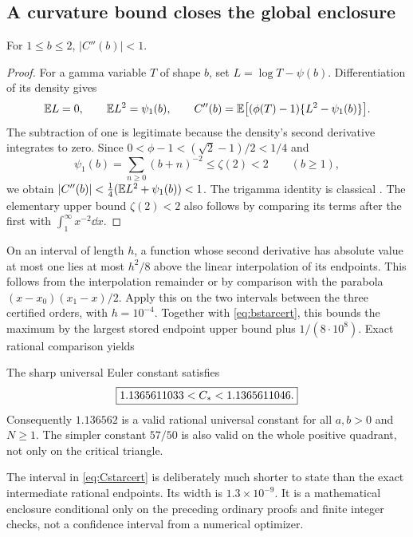 \subsection{A curvature bound closes the global enclosure}
\begin{lemma}\label{lem:curvature}
For $1\le b\le2$, $|C''(b)|<1$.
\end{lemma}
\begin{proof}
For a gamma variable $T$ of shape $b$, set $L=\log T-\psi(b)$. Differentiation of its density gives
\[
 \mathbb E L=0,\qquad \mathbb E L^2=\psi_1(b),\qquad
 C''(b)=\mathbb E\bigl[(\phi(T)-1)\{L^2-\psi_1(b)\}\bigr].
\]
The subtraction of one is legitimate because the density's second derivative integrates to zero. Since $0<\phi-1<(\sqrt2-1)/2<1/4$ and
\[
 \psi_1(b)=\sum_{n\ge0}(b+n)^{-2}\le\zeta(2)<2
 \qquad (b\ge1),
\]
we obtain $|C''(b)|<\tfrac14(\mathbb E L^2+\psi_1(b))<1$. The trigamma identity is classical \cite{DLMFpsi}. The elementary upper bound $\zeta(2)<2$ also follows by comparing its terms after the first with $\int_1^\infty x^{-2}\dd x$.
\end{proof}
On an interval of length $h$, a function whose second derivative has absolute value at most one lies at most $h^2/8$ above the linear interpolation of its endpoints. This follows from the interpolation remainder or by comparison with the parabola $(x-x_0)(x_1-x)/2$.
Apply this on the two intervals between the three certified orders, with $h=10^{-4}$. Together with \eqref{eq:bstarcert}, this bounds the maximum by the largest stored endpoint upper bound plus $1/(8\cdot10^8)$. Exact rational comparison yields
\begin{theorem}\label{thm:certified}
The sharp universal Euler constant satisfies
\begin{equation}\label{eq:Cstarcert}
 \boxed{1.1365611033<C_*<1.1365611046.}
\end{equation}
Consequently $1.136562$ is a valid rational universal constant for all $a,b>0$ and $N\ge1$. The simpler constant $57/50$ is also valid on the whole positive quadrant, not only on the critical triangle.
\end{theorem}
The interval in \eqref{eq:Cstarcert} is deliberately much shorter to state than the exact intermediate rational endpoints. Its width is $1.3\times10^{-9}$. It is a mathematical enclosure conditional only on the preceding ordinary proofs and finite integer checks, not a confidence interval from a numerical optimizer.

